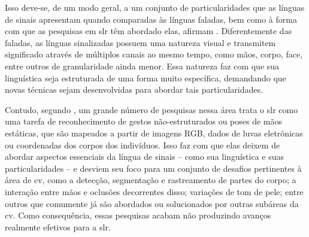 

Isso deve-se, de um modo geral, a um conjunto de particularidades que as línguas de sinais apresentam quando comparadas às línguas faladas, bem como à forma com que as pesquisas em \acrshort{slr} têm abordado elas, afirmam .
Diferentemente das faladas, as línguas sinalizadas possuem uma natureza visual e transmitem significado através de múltiplos canais ao mesmo tempo, como mãos, corpo, face, entre outros de granularidade ainda menor.
Essa natureza faz com que sua linguística seja estruturada de uma forma muito específica, demandando que novas técnicas sejam desenvolvidas para abordar tais particularidades.


Contudo, segundo , um grande número de pesquisas nessa área trata o \acrshort{slr} como uma tarefa de reconhecimento de gestos não-estruturados ou poses de mãos estáticas, que são mapeados a partir de imagens RGB, dados de luvas eletrônicas ou coordenadas dos corpos dos indivíduos.
Isso faz com que elas deixem de abordar aspectos essenciais da língua de sinais -- como sua linguística e suas particularidades -- e desviem seu foco para um conjunto de desafios pertinentes à área de \acrfull{cv}, como a detecção, segmentação e rastreamento de partes do corpo; a interação entre mãos e oclusões decorrentes disso; variações de tom de pele; entre outros que comumente já são abordados ou solucionados por outras subáreas da \acrshort{cv}.
Como consequência, essas pesquisas acabam não produzindo avanços realmente efetivos para a \acrshort{slr}.




